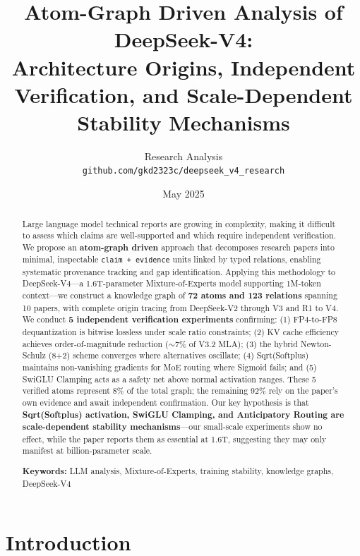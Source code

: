 \documentclass[11pt,a4paper]{article}
\title{Atom-Graph Driven Analysis of DeepSeek-V4: \\ Architecture Origins, Independent Verification, and Scale-Dependent Stability Mechanisms}
\author{
  Research Analysis\\
  \texttt{github.com/gkd2323c/deepseek\_v4\_research}
}
\date{May 2025}
\begin{document}
\maketitle

\begin{abstract}
Large language model technical reports are growing in complexity, making it difficult to assess which claims are well-supported and which require independent verification. We propose an \textbf{atom-graph driven} approach that decomposes research papers into minimal, inspectable \texttt{claim + evidence} units linked by typed relations, enabling systematic provenance tracking and gap identification. Applying this methodology to DeepSeek-V4---a 1.6T-parameter Mixture-of-Experts model supporting 1M-token context---we construct a knowledge graph of \textbf{72 atoms and 123 relations} spanning 10 papers, with complete origin tracing from DeepSeek-V2 through V3 and R1 to V4. We conduct \textbf{5 independent verification experiments} confirming: (1) FP4-to-FP8 dequantization is bitwise lossless under scale ratio constraints; (2) KV cache efficiency achieves order-of-magnitude reduction ($\sim$7\% of V3.2 MLA); (3) the hybrid Newton-Schulz (8+2) scheme converges where alternatives oscillate; (4) Sqrt(Softplus) maintains non-vanishing gradients for MoE routing where Sigmoid fails; and (5) SwiGLU Clamping acts as a safety net above normal activation ranges. These 5 verified atoms represent 8\% of the total graph; the remaining 92\% rely on the paper's own evidence and await independent confirmation. Our key hypothesis is that \textbf{Sqrt(Softplus) activation, SwiGLU Clamping, and Anticipatory Routing are scale-dependent stability mechanisms}---our small-scale experiments show no effect, while the paper reports them as essential at 1.6T, suggesting they may only manifest at billion-parameter scale.

\medskip
\noindent\textbf{Keywords:} LLM analysis, Mixture-of-Experts, training stability, knowledge graphs, DeepSeek-V4
\end{abstract}

\section{Introduction}
\label{sec:intro}
\end{document}
